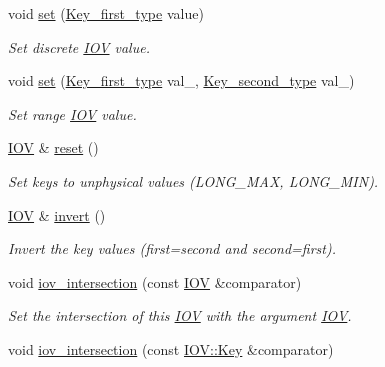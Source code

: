 \begin{DoxyCompactItemize}
void \hyperlink{class_d_d4hep_1_1_i_o_v_a8c9578e074d7c685fd7d1454b6b35d40}{set} (\hyperlink{class_d_d4hep_1_1_i_o_v_a3f518f6b507c82c4ee614e52b3519325}{Key\_\-first\_\-type} value)
\begin{DoxyCompactList}\small\item\em Set discrete \hyperlink{class_d_d4hep_1_1_i_o_v}{IOV} value. \item\end{DoxyCompactList}\item 
void \hyperlink{class_d_d4hep_1_1_i_o_v_ab1157ed01d8a99029c6d2cfc9379ac9b}{set} (\hyperlink{class_d_d4hep_1_1_i_o_v_a3f518f6b507c82c4ee614e52b3519325}{Key\_\-first\_\-type} val\_, \hyperlink{class_d_d4hep_1_1_i_o_v_ae1e4d1584dcc17a416008a93d94376b5}{Key\_\-second\_\-type} val\_)
\begin{DoxyCompactList}\small\item\em Set range \hyperlink{class_d_d4hep_1_1_i_o_v}{IOV} value. \item\end{DoxyCompactList}\item 
\hyperlink{class_d_d4hep_1_1_i_o_v}{IOV} \& \hyperlink{class_d_d4hep_1_1_i_o_v_acbc1f282468528fd38d471bf7f9d58c0}{reset} ()
\begin{DoxyCompactList}\small\item\em Set keys to unphysical values (LONG\_\-MAX, LONG\_\-MIN). \item\end{DoxyCompactList}\item 
\hyperlink{class_d_d4hep_1_1_i_o_v}{IOV} \& \hyperlink{class_d_d4hep_1_1_i_o_v_a5407ab1da0910ee18ca80dfa6985d0af}{invert} ()
\begin{DoxyCompactList}\small\item\em Invert the key values (first=second and second=first). \item\end{DoxyCompactList}\item 
void \hyperlink{class_d_d4hep_1_1_i_o_v_ae6f8261feefa4678c0842d43946d146d}{iov\_\-intersection} (const \hyperlink{class_d_d4hep_1_1_i_o_v}{IOV} \&comparator)
\begin{DoxyCompactList}\small\item\em Set the intersection of this \hyperlink{class_d_d4hep_1_1_i_o_v}{IOV} with the argument \hyperlink{class_d_d4hep_1_1_i_o_v}{IOV}. \item\end{DoxyCompactList}\item 
void \hyperlink{class_d_d4hep_1_1_i_o_v_ab045b2ff365c11e6ff93c4ca01270a49}{iov\_\-intersection} (const \hyperlink{class_d_d4hep_1_1_i_o_v_a07cb46dc875296dc9cccf4ff370104ae}{IOV::Key} \&comparator)

\end{DoxyCompactItemize}

